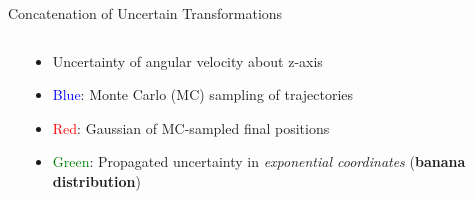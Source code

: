 \documentclass[14pt,aspectratio=169]{beamer}
\begin{document}
\begin{frame}[fragile]{Concatenation of Uncertain Transformations}
\begin{columns}
\begin{column}{0.4\textwidth}
{
}
\end{column}
\begin{column}{0.55\textwidth}
\begin{itemize}
\item Uncertainty of angular velocity about z-axis
\item \textcolor{blue}{Blue}: Monte Carlo (MC) sampling of trajectories
\item<2-> \textcolor{red}{Red}: Gaussian of MC-sampled final positions
\item<3-> \textcolor{green}{Green}: Propagated uncertainty in \textit{exponential coordinates}
(\textbf{banana distribution})
\end{itemize}
\end{column}
\end{columns}
\end{frame}
\end{document}
